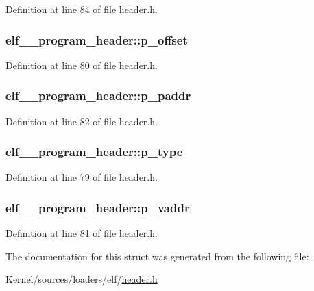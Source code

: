 Definition at line 84 of file header.h.

\hypertarget{structelf__32__program__header_aa3e8460560d072a37656cf4fdf4839f6}{
\subsubsection[{p\_\-offset}]{ {\bf elf\_\_\-program\_\-header::p\_\-offset}}}
\label{structelf__32__program__header_aa3e8460560d072a37656cf4fdf4839f6}


Definition at line 80 of file header.h.

\hypertarget{structelf__32__program__header_ac29cb8df1e8341ad6184020d374718b3}{
\subsubsection[{p\_\-paddr}]{ {\bf elf\_\_\-program\_\-header::p\_\-paddr}}}
\label{structelf__32__program__header_ac29cb8df1e8341ad6184020d374718b3}


Definition at line 82 of file header.h.

\hypertarget{structelf__32__program__header_af220a98c5b7f9968195246e76afc2c86}{
\subsubsection[{p\_\-type}]{ {\bf elf\_\_\-program\_\-header::p\_\-type}}}
\label{structelf__32__program__header_af220a98c5b7f9968195246e76afc2c86}


Definition at line 79 of file header.h.

\hypertarget{structelf__32__program__header_ab11f74e50c7ef5781fceeb94d729d423}{
\subsubsection[{p\_\-vaddr}]{ {\bf elf\_\_\-program\_\-header::p\_\-vaddr}}}
\label{structelf__32__program__header_ab11f74e50c7ef5781fceeb94d729d423}


Definition at line 81 of file header.h.



The documentation for this struct was generated from the following file:\begin{DoxyCompactItemize}
\item 
Kernel/sources/loaders/elf/\hyperlink{header_8h}{header.h}\end{DoxyCompactItemize}
